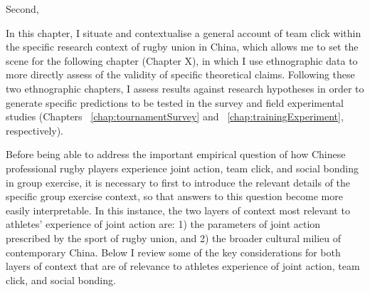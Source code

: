 \begin{CJK}{UTF8}{gbsn}
Second,



In this chapter, I situate and contextualise a general account of team click within the specific research context of rugby union in China, which allows me to set the scene for the following chapter (Chapter X), in which I use ethnographic data to more directly assess of the validity of specific theoretical claims.  Following these two ethnographic chapters, I assess results against research hypotheses in order to generate specific predictions to be tested in the survey and field experimental studies (Chapters ~\ref{chap:tournamentSurvey} and ~\ref{chap:trainingExperiment}, respectively).



Before being able to address the important empirical question of how Chinese professional rugby players experience joint action, team click, and social bonding in group exercise, it is necessary to first to introduce the relevant details of the specific group exercise context, so that answers to this question become more easily interpretable.  In this instance, the two layers of context most relevant to athletes’ experience of joint action are: 1) the parameters of joint action prescribed by the sport of rugby union, and 2) the broader cultural milieu of contemporary China.  Below I review some of the key considerations for both layers of context that are of relevance to athletes experience of joint action, team click, and social bonding.



\end{CJK}
